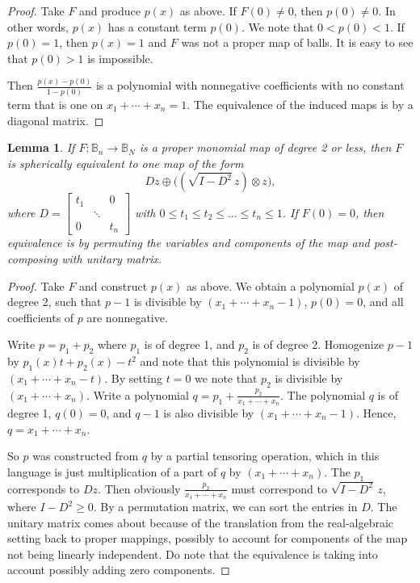 \documentclass[12pt,openany]{book}
\newcommand{\bB}{{\mathbb{B}}}
\theoremstyle{plain}
\newtheorem{lemma}[thm]{Lemma}
\theoremstyle{remark}
\theoremstyle{definition}
\theoremstyle{exercise}
\theoremstyle{example}
\begin{document}
\begin{proof}
Take $F$ and produce $p(x)$ as above.  If $F(0) \not = 0$, then
$p(0) \not= 0$.  In other words, $p(x)$ has a constant term $p(0)$.
We note that $0 < p(0) < 1$.  If $p(0) = 1$, then $p(x) = 1$ and $F$
was not a proper map of balls.  It is easy to see that $p(0) > 1$ is
impossible.

Then $\frac{p(x)-p(0)}{1-p(0)}$ is a
polynomial with nonnegative coefficients with no constant term that is one
on $x_1+\cdots+x_n = 1$.  The equivalence of the induced maps is by a
diagonal matrix.
\end{proof}

\begin{lemma}
If $F \colon \bB_n \to \bB_N$ is a proper monomial map of degree 2 or less,
then $F$ is spherically equivalent to one map
of the form
\begin{equation}
D z \oplus \bigl( ( \sqrt{I-D^2} \, z ) \otimes z \bigr) ,
\end{equation}
where $D =
\left[
\begin{smallmatrix}
t_1 & & 0 \\
 & \ddots & \\
0 & & t_n
\end{smallmatrix}
\right]$
with $0 \leq t_1 \leq t_2 \leq \dots \leq t_n \leq 1$.
If $F(0) = 0$, then
equivalence is by permuting the variables and 
components of the map and 
post-composing with unitary matrix.
\end{lemma}

\begin{proof}
Take $F$ and construct $p(x)$ as above.
We obtain a
polynomial $p(x)$ of degree 2, such that
$p-1$ is divisible by
$(x_1+\cdots+x_n-1)$, $p(0) = 0$, and all coefficients of $p$ are nonnegative.

Write $p = p_1 + p_2$ where $p_1$ is of degree 1, and $p_2$ is of degree 2.
Homogenize $p-1$ by
$p_1(x) t + p_2(x) - t^2$ and note that this polynomial is divisible
by
$(x_1+\cdots+x_n-t)$.  By setting $t=0$ we note that $p_2$ is
divisible by 
$(x_1+\cdots+x_n)$.
Write a polynomial $q = p_1 + \frac{p_2}{x_1+\cdots+x_n}$.
The polynomial $q$ is of degree 1, $q(0) = 0$, and $q-1$ is also divisible by
$(x_1+\cdots+x_n-1)$.
Hence, $q = x_1+\cdots+x_n$.

So $p$ was constructed from $q$ by a partial tensoring
operation, which in this language is just multiplication of a part of $q$
by $(x_1+\cdots+x_n)$.  The $p_1$ corresponds to $Dz$.  Then
obviously 
$\frac{p_2}{x_1+\cdots+x_n}$ must correspond to $\sqrt{I-D^2}\,z$,
where $I-D^2 \geq 0$.
By a permutation matrix, we can sort the entries in $D$.
The unitary matrix comes about because of the translation from
the real-algebraic setting back to proper mappings, possibly to account for
components of the map not being linearly independent.  Do note that the
equivalence is taking into account possibly adding zero components.
\end{proof}
\end{document}

